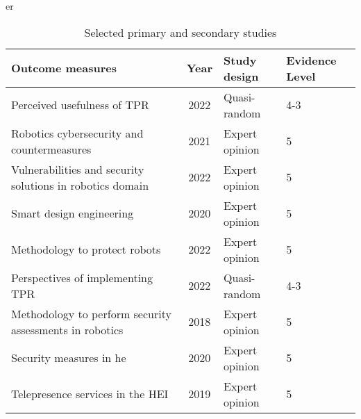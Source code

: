 \begin{table}[h!]
\centering
er
\caption{Selected primary and secondary studies}
\label{tab:studies}
\begin{tabularx}{\columnwidth}{lcll}
\toprule
\textbf{Outcome measures}                                                                       & \textbf{Year} & \textbf{Study design} & \textbf{Evidence Level} \\
\midrule
Perceived usefulness of \ac{TPR}~\cite[]{acceptance-telepresence-robots-2022}                  & 2022          & Quasi-random          & 4-3                     \\
Robotics cybersecurity and countermeasures~\cite[]{cyber_security_issues_in_robotics_2021}                                     & 2021          & Expert opinion        & 5                       \\
Vulnerabilities and security solutions in robotics domain~\cite[]{robotics_cyber_security_2022}                                  & 2022& Expert opinion& 5                       \\
Smart design engineering~\cite[]{smart_design_engineering_2020}                                 & 2020          & Expert opinion& 5                       \\
Methodology to protect robots~\cite[]{robot_security_review_2022}                               & 2022          & Expert opinion& 5                       \\
Perspectives of implementing \ac{TPR}~\cite[]{higher_edu_perception_on_tprs_2022}                                                         & 2022          & Quasi-random          & 4-3                     \\
Methodology to perform security assessments in robotics~\cite[]{robot_security_framework_2018}                                         & 2018          & Expert opinion& 5                       \\
Security measures in \ac{he}~\cite[]{role_of_cyber_security_in_higher_edu_2020}                 & 2020          & Expert opinion& 5                       \\
Telepresence services in the \ac{HEI}~\cite[]{telepresence_robots_in_classroom_2019}                                                           & 2019          & Expert opinion& 5                       \\
\bottomrule
\end{tabularx}
\end{table}



